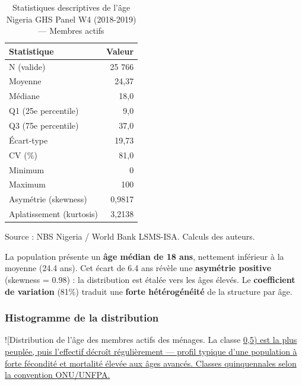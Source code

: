 \documentclass[
  10pt,
]{article}
\begin{document}
\begin{table}
\caption*{
{\fontsize{9}{11}\selectfont  Statistiques descriptives de l'âge\fontsize{8}{9}\selectfont } \\ 
{\fontsize{8}{9}\selectfont  Nigeria GHS Panel W4 (2018-2019) — Membres actifs\fontsize{8}{9}\selectfont }
} 
\fontsize{8.0pt}{9.0pt}\selectfont
\begin{tabular*}{\linewidth}{@{\extracolsep{\fill}}lr}
\toprule
Statistique & Valeur \\ 
\midrule\addlinespace[2.5pt]
N (valide) & 25 766 \\ 
Moyenne & 24,37 \\ 
Médiane & 18,0 \\ 
Q1 (25e percentile) & 9,0 \\ 
Q3 (75e percentile) & 37,0 \\ 
Écart-type & 19,73 \\ 
CV (\%) & 81,0 \\ 
Minimum & 0 \\ 
Maximum & 100 \\ 
Asymétrie (skewness) & 0,9817 \\ 
Aplatissement (kurtosis) & 3,2138 \\ 
\bottomrule
\end{tabular*}
\begin{minipage}{\linewidth}
\vspace{.05em}
Source : NBS Nigeria / World Bank LSMS-ISA. Calculs des auteurs.\\
\end{minipage}
\end{table}

La population présente un \textbf{âge médian de 18 ans}, nettement
inférieur à la moyenne (24.4 ans). Cet écart de 6.4 ans révèle une
\textbf{asymétrie positive} (skewness = 0.98) : la distribution est
étalée vers les âges élevés. Le \textbf{coefficient de variation} (81\%)
traduit une \textbf{forte hétérogénéité} de la structure par âge.

\subsubsection{Histogramme de la
distribution}\label{histogramme-de-la-distribution}

!{[}Distribution de l'âge des membres actifs des ménages. La classe
\label{fig-hist-age}\href{outputs/figures/fig01_histogramme_age.png}{0,5)
est la plus peuplée, puis l'effectif décroît régulièrement --- profil
typique d'une population à forte fécondité et mortalité élevée aux âges
avancés. Classes quinquennales selon la convention ONU/UNFPA.}
\end{document}
